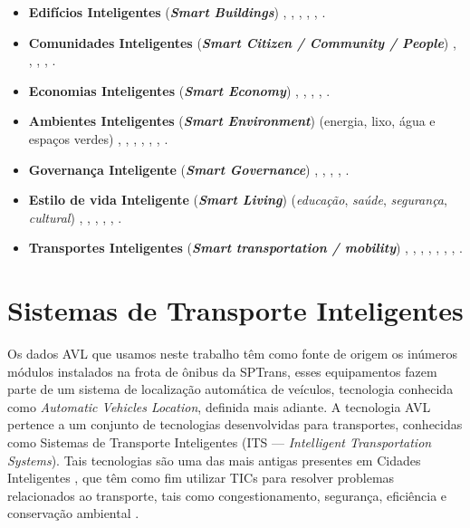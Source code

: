 \documentclass[
	12pt,				%
	oneside,			%
	a4paper,			%
	english,			%
	brazil				%
	]{abntex2ppgsi}
\begin{document}
{\begin{itemize}
\item \textbf{Edifícios Inteligentes} (\textit{\textbf{Smart Buildings}}) \cite{Talari2017}, \cite{Moreno2017}, \cite{Ang2017}, \cite{Finger2017}, \cite{Santos2017}, \cite{Kummitha2017}.
\item \textbf{Comunidades Inteligentes} (\textit{\textit{\textbf{Smart Citizen / Community / People}}}) \cite{Talari2017}, \cite{Santos2017}, \cite{Kummitha2017}, \cite{Barth2017}, \cite{Ahvenniemi2017}.
\item \textbf{Economias Inteligentes} (\textit{\textbf{Smart Economy}}) \cite{Santos2017}, \cite{Kummitha2017}, \cite{Barth2017}, \cite{Xiao2017}, \cite{Ahvenniemi2017}.
\item \textbf{Ambientes Inteligentes} (\textit{\textbf{Smart Environment}}) (energia, lixo, água e espaços verdes) \cite{Santos2017}, \cite{Finger2017}, \cite{Talari2017}, \cite{Ang2017}, \cite{Kummitha2017}, \cite{Barth2017}, \cite{Ahvenniemi2017}.
\item \textbf{Governança Inteligente} (\textit{\textbf{Smart Governance}}) \cite{Talari2017}, \cite{Santos2017}, \cite{Kummitha2017}, \cite{Barth2017}, \cite{Ahvenniemi2017}.
\item \textbf{Estilo de vida Inteligente} (\textit{\textbf{Smart Living}}) (\textit{educação}, \textit{saúde}, \textit{segurança}, \textit{cultural}) \cite{Santos2017}, \cite{Talari2017}, \cite{Kummitha2017}, \cite{Barth2017}, \cite{Xiao2017}, \cite{Ahvenniemi2017}.
\item \textbf{Transportes Inteligentes} (\textit{\textbf{Smart transportation / mobility}}) \cite{Talari2017}, \cite{Moreno2017}, \cite{Ang2017}, \cite{Finger2017}, \cite{Santos2017}, \cite{Kummitha2017}, \cite{Barth2017}, \cite{Ahvenniemi2017}.
\end{itemize}

\section{Sistemas de Transporte Inteligentes}
\label{its}

Os dados AVL que usamos neste trabalho têm como fonte de origem os inúmeros módulos instalados na frota de ônibus da SPTrans, esses equipamentos fazem parte de um sistema de localização automática de veículos, tecnologia conhecida como \textit{Automatic Vehicles Location}, definida mais adiante. A tecnologia AVL pertence a um conjunto de tecnologias desenvolvidas para transportes, conhecidas como Sistemas de Transporte Inteligentes (ITS --- \textit{Intelligent Transportation Systems}). Tais tecnologias são uma das mais antigas presentes em Cidades Inteligentes \cite{menouar2017uav}, que têm como fim utilizar TICs para resolver problemas relacionados ao transporte, tais como congestionamento, segurança, eficiência e conservação ambiental \cite{figueiredo2001towards}. 

}
\end{document}
